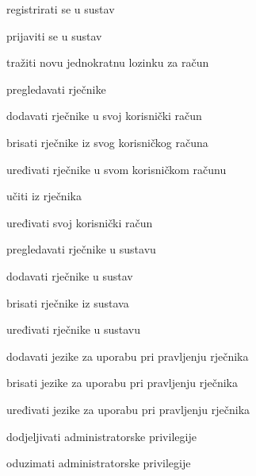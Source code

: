 			
			\begin{packed_enum}
				\item  {}
				
				\begin{packed_enum}
					\item registrirati se u sustav
					\item prijaviti se u sustav
					\item tražiti novu jednokratnu lozinku za račun
				\end{packed_enum}

				
			
				\item  {}
				
				\begin{packed_enum}
					\item pregledavati rječnike
					\item dodavati rječnike u svoj korisnički račun
					\item brisati rječnike iz svog korisničkog računa
					\item uređivati rječnike u svom korisničkom računu
					\item učiti iz rječnika
					\item uređivati svoj korisnički račun
					
				\end{packed_enum}

				\item {}
				\begin{packed_enum}
					\item pregledavati rječnike u sustavu
					\item dodavati rječnike u sustav
					\item brisati rječnike iz sustava
					\item uređivati rječnike u sustavu
					\item dodavati jezike za uporabu pri pravljenju rječnika
					\item brisati jezike za uporabu pri pravljenju rječnika
					\item uređivati jezike za uporabu pri pravljenju rječnika
					\item dodjeljivati administratorske privilegije
					\item oduzimati administratorske privilegije
				\end{packed_enum}


\end{packed_enum}
